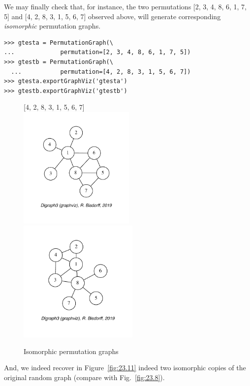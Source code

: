 We may finally check that, for instance, the two permutations [2, 3, 4, 8, 6, 1, 7, 5] and [4, 2, 8, 3, 1, 5, 6, 7] observed above, will generate corresponding \emph{isomorphic} permutation graphs.
\begin{lstlisting}  
>>> gtesta = PermutationGraph(\
...             permutation=[2, 3, 4, 8, 6, 1, 7, 5])
>>> gtestb = PermutationGraph(\
  ...           permutation=[4, 2, 8, 3, 1, 5, 6, 7])
>>> gtesta.exportGraphViz('gtesta')
>>> gtestb.exportGraphViz('gtestb')
\end{lstlisting}
\begin{figure}[ht]
  [2, 3, 4, 8, 6, 1, 7, 5]\hfill [4, 2, 8, 3, 1, 5, 6, 7]\\
  \includegraphics[height=6cm]{Figures/23-11-gtesta.pdf}\hfill
  \includegraphics[height=6cm]{Figures/23-11-gtestb.pdf}
\caption{Isomorphic permutation graphs} 
\label{fig:23.11}       %
\end{figure}
And, we indeed recover in Figure~\vref{fig:23.11} indeed two isomorphic copies of the original random graph (compare with Fig.~\vref{fig:23.8}).
 

%
%
